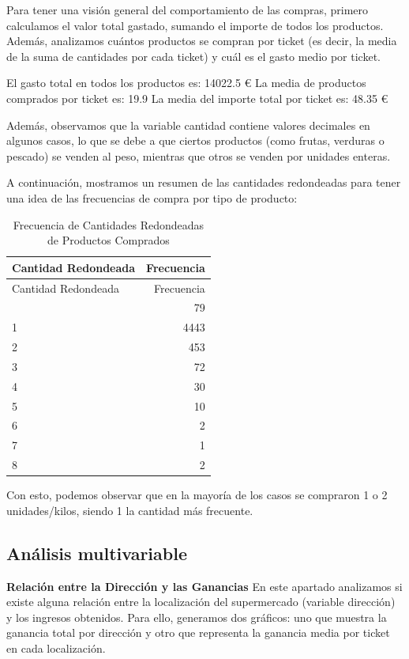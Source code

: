\documentclass[,article,submit,moreauthors,pdftex]{Definitions/mdpi}
\begin{document}
Para tener una visión general del comportamiento de las compras, primero
calculamos el valor total gastado, sumando el importe de todos los
productos. Además, analizamos cuántos productos se compran por ticket
(es decir, la media de la suma de cantidades por cada ticket) y cuál es
el gasto medio por ticket.

El gasto total en todos los productos es: 14022.5 € La media de
productos comprados por ticket es: 19.9 La media del importe total por
ticket es: 48.35 €

Además, observamos que la variable cantidad contiene valores decimales
en algunos casos, lo que se debe a que ciertos productos (como frutas,
verduras o pescado) se venden al peso, mientras que otros se venden por
unidades enteras.

A continuación, mostramos un resumen de las cantidades redondeadas para
tener una idea de las frecuencias de compra por tipo de producto:

\begin{longtable}[]{@{}lr@{}}
\caption{Frecuencia de Cantidades Redondeadas de Productos
Comprados}\tabularnewline
\toprule\noalign{}
Cantidad Redondeada & Frecuencia \\
\midrule\noalign{}
\endfirsthead
\toprule\noalign{}
Cantidad Redondeada & Frecuencia \\
\midrule\noalign{}
\endhead
\bottomrule\noalign{}
\endlastfoot
0 & 79 \\
1 & 4443 \\
2 & 453 \\
3 & 72 \\
4 & 30 \\
5 & 10 \\
6 & 2 \\
7 & 1 \\
8 & 2 \\
\end{longtable}

Con esto, podemos observar que en la mayoría de los casos se compraron 1
o 2 unidades/kilos, siendo 1 la cantidad más frecuente.

\hypertarget{anuxe1lisis-multivariable}{%
\subsection{Análisis multivariable}\label{anuxe1lisis-multivariable}}

\textbf{Relación entre la Dirección y las Ganancias} En este apartado
analizamos si existe alguna relación entre la localización del
supermercado (variable dirección) y los ingresos obtenidos. Para ello,
generamos dos gráficos: uno que muestra la ganancia total por dirección
y otro que representa la ganancia media por ticket en cada localización.
\end{document}
